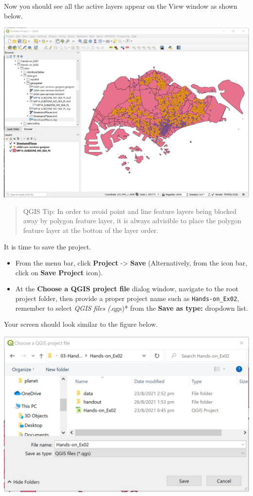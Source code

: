 \documentclass[
  letterpaper,
  DIV=11,
  numbers=noendperiod]{scrreprt}
\providecommand{\tightlist}{%
  \setlength{\itemsep}{0pt}\setlength{\parskip}{0pt}}\usepackage{longtable,booktabs,array}
\begin{document}
Now you should see all the active layers appear on the View window as
shown below.

\includegraphics{./img02/image7.jpg}

\begin{quote}
QGIS Tip: In order to avoid point and line feature layers being blocked
away by polygon feature layer, it is always advisible to place the
polygon feature layer at the botton of the layer order.
\end{quote}

It is time to save the project.

\begin{itemize}
\tightlist
\item
  From the menu bar, click \textbf{Project} -\textgreater{}
  \textbf{Save} (Alternatively, from the icon bar, click on \textbf{Save
  Project} icon).
\item
  At the \textbf{Choose a QGIS project file} dialog window, navigate to
  the root project folder, then provide a proper project name such as
  \texttt{Hands-on\_Ex02}, remember to select \emph{QGIS files (}.qgs)*
  from the \textbf{Save as type:} dropdown list.
\end{itemize}

Your screen should look similar to the figure below.

\includegraphics{./img02/image8.jpg}
\end{document}
